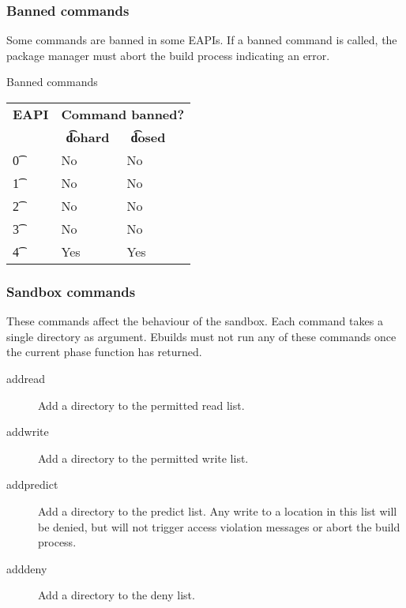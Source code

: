 \subsubsection{Banned commands}
\label{sec:banned-commands}

 Some commands are banned in some EAPIs. If a banned command is
called, the package manager must abort the build process indicating an error.

\begin{centertable}{Banned commands} \label{tab:banned-commands-table}
    \begin{tabular}{ l l l l }
        \toprule
        \multicolumn{1}{c}{\textbf{EAPI}} &
        \multicolumn{3}{c}{\textbf{Command banned?}} \\
        \multicolumn{1}{c}{} &
        \multicolumn{1}{c}{\textbf{\t{dohard}}} &
        \multicolumn{1}{c}{\textbf{\t{dosed}}} \\
        \midrule
    \t{0} & No & No \\
    \t{1} & No & No \\
    \t{2} & No & No \\
    \t{3} & No & No \\
    \t{4} & Yes & Yes \\
    \bottomrule
    \end{tabular}
\end{centertable}

\subsubsection{Sandbox commands}
These commands affect the behaviour of the sandbox. Each command takes a single directory as
argument. Ebuilds must not run any of these commands once the current phase function has returned.
\begin{description}
\item[addread] Add a directory to the permitted read list.
\item[addwrite] Add a directory to the permitted write list.
\item[addpredict] Add a directory to the predict list. Any write to a location in this list will be
    denied, but will not trigger access violation messages or abort the build process.
\item[adddeny] Add a directory to the deny list.
\end{description}

